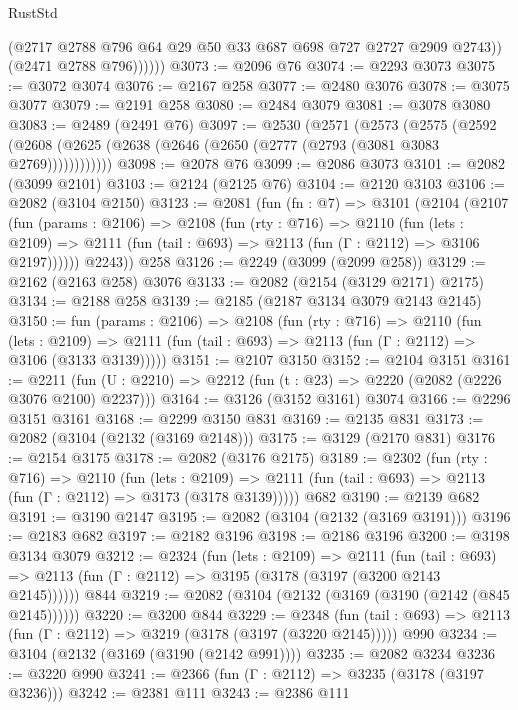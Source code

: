 \begin{lexlean}{RustStd}
\begin{coremodule}
                (@2717 @2788 @796 @64 @29 @50 @33 @687 @698 @727 @2727 @2909 @2743))
              (@2471 @2788 @796))))))
@3073 := @2096 @76
@3074 := @2293 @3073
@3075 := @3072 @3074
@3076 := @2167 @258
@3077 := @2480 @3076
@3078 := @3075 @3077
@3079 := @2191 @258
@3080 := @2484 @3079
@3081 := @3078 @3080
@3083 := @2489 (@2491 @76)
@3097 := @2530
    (@2571
      (@2573
        (@2575
          (@2592 (@2608 (@2625 (@2638 (@2646 (@2650 (@2777 (@2793 (@3081 @3083 @2769))))))))))))
@3098 := @2078 @76
@3099 := @2086 @3073
@3101 := @2082 (@3099 @2101)
@3103 := @2124 (@2125 @76)
@3104 := @2120 @3103
@3106 := @2082 (@3104 @2150)
@3123 := @2081
    (fun (fn : @7) =>
    @3101
      (@2104
        (@2107
          (fun (params : @2106) =>
          @2108
            (fun (rty : @716) =>
            @2110
              (fun (lets : @2109) =>
              @2111 (fun (tail : @693) => @2113 (fun (Γ : @2112) => @3106 @2197))))))
        @2243))
    @258
@3126 := @2249 (@3099 (@2099 @258))
@3129 := @2162 (@2163 @258) @3076
@3133 := @2082 (@2154 (@3129 @2171) @2175)
@3134 := @2188 @258
@3139 := @2185 (@2187 @3134 @3079 @2143 @2145)
@3150 := fun (params : @2106) =>
  @2108
    (fun (rty : @716) =>
    @2110
      (fun (lets : @2109) =>
      @2111 (fun (tail : @693) => @2113 (fun (Γ : @2112) => @3106 (@3133 @3139)))))
@3151 := @2107 @3150
@3152 := @2104 @3151
@3161 := @2211 (fun (U : @2210) => @2212 (fun (t : @23) => @2220 (@2082 (@2226 @3076 @2100) @2237)))
@3164 := @3126 (@3152 @3161) @3074
@3166 := @2296 @3151 @3161
@3168 := @2299 @3150 @831
@3169 := @2135 @831
@3173 := @2082 (@3104 (@2132 (@3169 @2148)))
@3175 := @3129 (@2170 @831)
@3176 := @2154 @3175
@3178 := @2082 (@3176 @2175)
@3189 := @2302
    (fun (rty : @716) =>
    @2110
      (fun (lets : @2109) =>
      @2111 (fun (tail : @693) => @2113 (fun (Γ : @2112) => @3173 (@3178 @3139)))))
    @682
@3190 := @2139 @682
@3191 := @3190 @2147
@3195 := @2082 (@3104 (@2132 (@3169 @3191)))
@3196 := @2183 @682
@3197 := @2182 @3196
@3198 := @2186 @3196
@3200 := @3198 @3134 @3079
@3212 := @2324
    (fun (lets : @2109) =>
    @2111
      (fun (tail : @693) => @2113 (fun (Γ : @2112) => @3195 (@3178 (@3197 (@3200 @2143 @2145))))))
    @844
@3219 := @2082 (@3104 (@2132 (@3169 (@3190 (@2142 (@845 @2145))))))
@3220 := @3200 @844
@3229 := @2348
    (fun (tail : @693) => @2113 (fun (Γ : @2112) => @3219 (@3178 (@3197 (@3220 @2145)))))
    @990
@3234 := @3104 (@2132 (@3169 (@3190 (@2142 @991))))
@3235 := @2082 @3234
@3236 := @3220 @990
@3241 := @2366 (fun (Γ : @2112) => @3235 (@3178 (@3197 @3236)))
@3242 := @2381 @111
@3243 := @2386 @111

\end{coremodule}
\end{lexlean}
